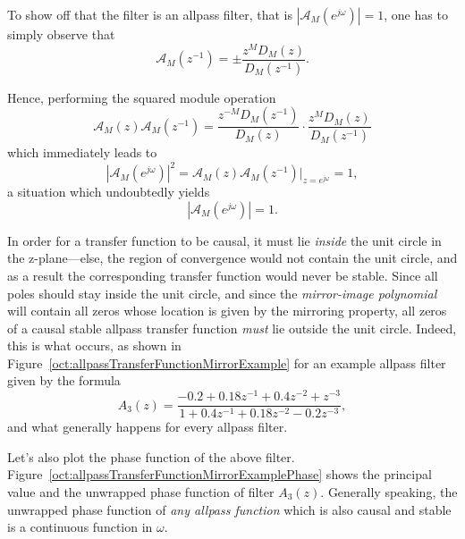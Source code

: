 \documentclass[\documentfontsize, twocolumn]{\classname}
\begin{document}
To show off that the filter is an allpass filter, that is $\left| \mathcal A_M(e^{j\omega}) \right| = 1$, one has to simply observe that
\[
    \mathcal A_M(z^{-1}) = \pm \frac {
        z^{M} D_M(z)
    } {
        D_M(z^{-1})
    }.
\]

Hence, performing the squared module operation
\[
    \mathcal A_M(z) \mathcal A_M(z^{-1}) = \frac {
        z^{-M} D_M(z^{-1})
    } {
        D_M(z)
    } \cdot \frac {
        z^{M} D_M(z)
    } {
        D_M(z^{-1})
    }
\]
which immediately leads to
\[
    \left|\mathcal A_M(e^{j\omega})\right|^2 = \mathcal A_M(z) \mathcal A_M(z^{-1})\Bigr\rvert_{z=e^{j\omega}} = 1,
\]
a situation which undoubtedly yields
\[
    \left|\mathcal A_M(e^{j\omega})\right| = 1.
\]

In order for a transfer function to be causal, it must lie \emph{inside} the unit circle in the z-plane---else, the region of convergence would not contain the unit circle, and as a result the corresponding transfer function would never be stable. Since all poles should stay inside the unit circle, and since the \emph{mirror-image polynomial} will contain all zeros whose location is given by the mirroring property, all zeros of a causal stable allpass transfer function \emph{must} lie outside the unit circle. Indeed, this is what occurs, as shown in Figure~\ref{oct:allpassTransferFunctionMirrorExample} for an example allpass filter given by the formula
\[
    A_3(z) = \frac{
        -0.2 + 0.18z^{-1} + 0.4z^{-2} + z^{-3}
    } {
        1 + 0.4z^{-1} + 0.18z^{-2} - 0.2z^{-3}
    }, 
\]
and what generally happens for every allpass filter.

\begin{figure*}[ht]
\begin{center}
\scalebox{0.45}{
    
}\caption{Principal value---wrapped and unwrapped---of $3$-rd order allpass function $A_3(z)$. Notice the discointinuity by the amount of $2\pi$ in the phase $\theta(\omega)$; the discontinuity is generally solved by unwrapping the phase as seen in previous chapters.}\label{oct:allpassTransferFunctionMirrorExamplePhase}
\end{center}
\end{figure*}

Let's also plot the phase function of the above filter. Figure~\ref{oct:allpassTransferFunctionMirrorExamplePhase} shows the principal value and the unwrapped phase function of filter $A_3(z)$.
Generally speaking, the unwrapped phase function of \emph{any allpass function} which is also causal and stable is a continuous function in $\omega$.
\end{document}
